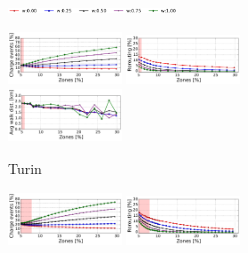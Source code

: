 \begin{figure}[t!]
    \begin{center}
        \begin{subfigure}{\textwidth}
		    \begin{center}
       		    \includegraphics[width=0.49\textwidth]{figures/legenda.pdf}
                \vspace{-0.1cm}
       	    \end{center}
            \includegraphics[width=0.33\textwidth]{figures/cut_Torino_AmountRechargePercVsZones_Policy_44_tt-25_100_4.pdf}
            \includegraphics[width=0.33\textwidth]{figures/cut_Torino_ReroutePercVsZones_Policy_44_tt-25_100_4.pdf}
            \includegraphics[width=0.33\textwidth]{figures/cut_Torino_AvgWalkedDistanceVsZones_Policy_44_tt-25_100_4.pdf}
            \caption{Turin}
            \label{fig:zone_vs_metric_torino}
        \end{subfigure}
         \begin{subfigure}{\textwidth}
            \includegraphics[width=0.33\textwidth]{figures/cut_Milano_AmountRechargePercVsZones_Policy_44_tt-25_100_4.pdf}
            \includegraphics[width=0.33\textwidth]{figures/cut_Milano_ReroutePercVsZones_Policy_44_tt-25_100_4.pdf}

\end{subfigure}
\end{center}
\end{figure}
